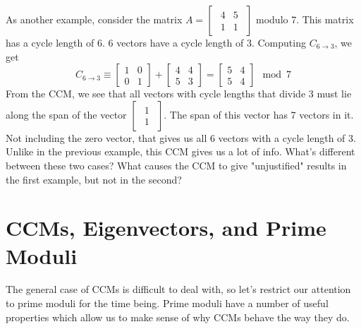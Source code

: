 \documentclass[a4paper, 12pt, reqno]{amsart}
\begin{document}
	As another example, consider the matrix $A = 
	\begin{bmatrix}
		\begin{smallmatrix}
			4 & 5 \\
			1 & 1
		\end{smallmatrix}
	\end{bmatrix}$ modulo 7. This matrix has a cycle length of 6. 6 vectors have a cycle length of 3. Computing $C_{6 \rightarrow 3}$, we get
	\[
		C_{6 \rightarrow 3} \equiv 
		\begin{bmatrix}
			1 & 0 \\
			0 & 1
		\end{bmatrix} +
		\begin{bmatrix}
			4 & 4 \\
			5 & 3
		\end{bmatrix} = 
		\begin{bmatrix}
			5 & 4 \\
			5 & 4
		\end{bmatrix} \mod{7}
	\]
	From the CCM, we see that all vectors with cycle lengths that divide 3 must lie along the span of the vector
	$\begin{bmatrix}
		\begin{smallmatrix}
			1 \\
			1
		\end{smallmatrix}
	\end{bmatrix}$. The span of this vector has 7 vectors in it. Not including the zero vector, that gives us all 6 vectors with a cycle length of 3. Unlike in the
	previous example, this CCM gives us a lot of info. What's different between these two cases? What causes the CCM to give "unjustified" results in the first example,
	but not in the second?
	
	\section{CCMs, Eigenvectors, and Prime Moduli}
	The general case of CCMs is difficult to deal with, so let's restrict our attention to prime moduli for the time being. Prime moduli have a number of useful properties
	which allow us to make sense of why CCMs behave the way they do.
	
\end{document}
